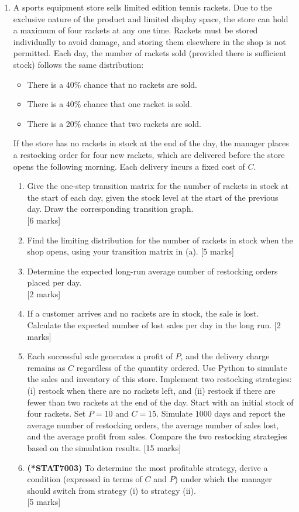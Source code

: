\documentclass[12pt]{article}
\begin{document}
\begin{enumerate}
\vspace{5pt}
\item A sports equipment store sells limited edition tennis rackets. Due to the exclusive nature of the product and limited display space, the store can hold a maximum of four rackets at any one time. Rackets must be stored individually to avoid damage, and storing them elsewhere in the shop is not permitted.
%
Each day, the number of rackets sold (provided there is sufficient stock) follows the same distribution:
\begin{itemize}
	\item There is a 40\% chance that no rackets are sold.
	\item There is a 40\% chance that one racket is sold.
	\item There is a 20\% chance that two rackets are sold.
	\end{itemize}
%
If the store has no rackets in stock at the end of the day, the manager places a restocking order for four new rackets, which are delivered before the store opens the following morning. Each delivery incurs a fixed cost of $C$.  
%
\begin{enumerate}
\item Give the one-step transition matrix for the number of rackets in stock at the start of each day, given the stock level at the start of the previous day. Draw the corresponding transition graph. 
			\\\phantom{1}\hfill [6 marks]
%
\item Find the limiting distribution for the number of rackets in stock when the shop opens, using your transition matrix in (a). 
			\hfill [5 marks]
%
\item Determine the expected long-run average number of restocking orders placed per day. 
			\\\phantom{1}\hfill [2 marks]
%
\item If a customer arrives and no rackets are in stock, the sale is lost. Calculate the expected number of lost sales per day in the long run. 
			\hfill [2 marks]
%
\item Each successful sale generates a profit of $P$, and the delivery charge remains as $C$ regardless of the quantity ordered. Use {\sf Python} to simulate the sales and inventory of this store. Implement two restocking strategies: (i) restock when there are no rackets left, and (ii) restock if there are fewer than two rackets at the end of the day. 
Start with an initial stock of four rackets. Set $P=10$ and $C=15$. Simulate $1000$ days and report the average number of restocking orders, the average number of sales lost, and the average profit from sales. Compare the two restocking strategies based on the simulation results.   
			\hfill [15 marks]
%
\item {\bf (*STAT7003)} To determine the most profitable strategy, derive a condition (expressed in terms of $C$ and $P$) under which the manager should switch from strategy (i) to strategy (ii).   
			\\\phantom{1}\hfill [5 marks] 
%
\end{enumerate}


\end{enumerate}
\end{document}
